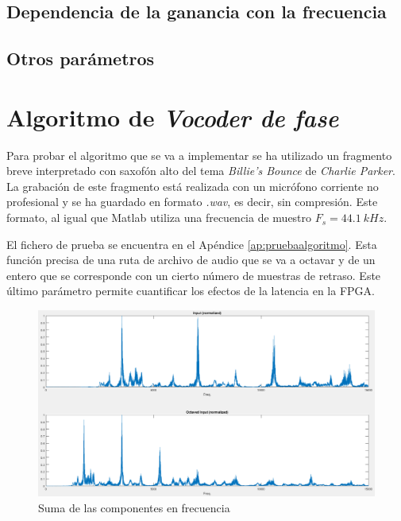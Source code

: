 \subsection{Dependencia de la ganancia con la frecuencia}
\subsection{Otros parámetros}
\section{Algoritmo de \emph{Vocoder de fase}}

Para probar el algoritmo que se va a implementar se ha utilizado un fragmento breve interpretado con saxofón alto del tema \emph{Billie's Bounce} de \emph{Charlie Parker}. La grabación de este fragmento está realizada con un micrófono corriente no profesional y se ha guardado en formato \emph{.wav}, es decir, sin compresión. Este formato, al igual que Matlab utiliza una frecuencia de muestro $F_{s} = 44.1~kHz$.

El fichero de prueba se encuentra en el Apéndice \ref{ap:pruebaalgoritmo}. Esta función precisa de una ruta de archivo de audio que se va a octavar y de un entero que se corresponde con un cierto número de muestras de retraso. Este último parámetro permite cuantificar los efectos de la latencia en la FPGA.

\begin{figure}[hbt]
\begin{center}
\includegraphics[width=15cm]{img/testAlFreq.png}
\caption{\label{fig:testFreq}Suma de las componentes en frecuencia}
\end{center}
\end{figure}

